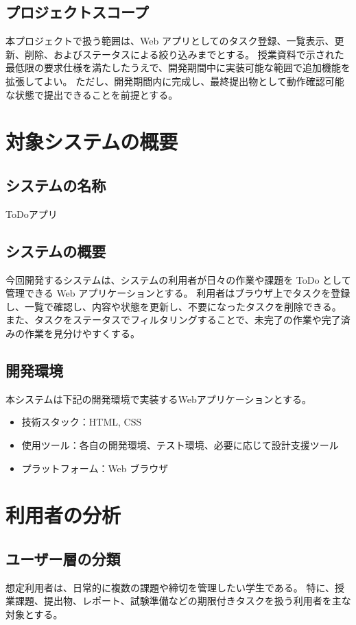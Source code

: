 \documentclass[dvipdfmx,10pt]{jarticle}
\begin{document}
    \subsection{プロジェクトスコープ}
    本プロジェクトで扱う範囲は、Web アプリとしてのタスク登録、一覧表示、更新、削除、およびステータスによる絞り込みまでとする。
    授業資料で示された最低限の要求仕様を満たしたうえで、開発期間中に実装可能な範囲で追加機能を拡張してよい。
    ただし、開発期間内に完成し、最終提出物として動作確認可能な状態で提出できることを前提とする。
    
    \pagebreak

    \section{対象システムの概要}
    \label{sec:overview}
    \subsection{システムの名称}
    ToDoアプリ

    \subsection{システムの概要}
    今回開発するシステムは、システムの利用者が日々の作業や課題を ToDo として管理できる Web アプリケーションとする。
    利用者はブラウザ上でタスクを登録し、一覧で確認し、内容や状態を更新し、不要になったタスクを削除できる。
    また、タスクをステータスでフィルタリングすることで、未完了の作業や完了済みの作業を見分けやすくする。

    \subsection{開発環境}
    本システムは下記の開発環境で実装するWebアプリケーションとする。
    \begin{itemize}
        \item 技術スタック：HTML, CSS
        \item 使用ツール：各自の開発環境、テスト環境、必要に応じて設計支援ツール
        \item プラットフォーム：Web ブラウザ
    \end{itemize}
\pagebreak
    \section{利用者の分析}
    \label{sec:users}
    \subsection{ユーザー層の分類}
    想定利用者は、日常的に複数の課題や締切を管理したい学生である。
    特に、授業課題、提出物、レポート、試験準備などの期限付きタスクを扱う利用者を主な対象とする。
\end{document}
